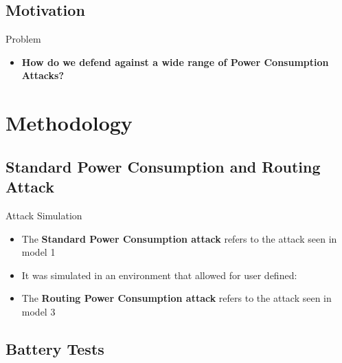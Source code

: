 \documentclass{beamer}
\begin{document}

\subsection{Motivation}

\begin{frame}{Problem}
\begin{itemize}

	\item \textbf{How do we defend against a wide range of Power Consumption Attacks?}
	
\end{itemize}
\end{frame}

\section{Methodology}

\subsection{Standard Power Consumption and Routing Attack}

\begin{frame}{Attack Simulation}
	\begin{itemize}
	\item The \textbf{Standard Power Consumption attack} refers to the attack seen in model 1
	\item It was simulated in an environment that allowed for user defined: 
	\item The \textbf{Routing Power Consumption attack} refers to the attack seen in model 3
	
	\end{itemize}
\end{frame}

\subsection{Battery Tests}
\end{document}
